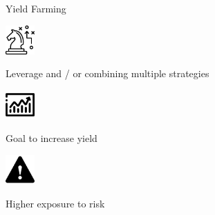 \documentclass[handout]{beamer}
\begin{document}
\begin{frame}{Yield Farming}


\begin{minipage}{0.2\textwidth}
			\begin{center}
				\includegraphics[height=3em]{../assets/images/strategy.png}
				
			\end{center}
		\end{minipage}
		\hspace{1 em}
		\begin{minipage}{0.72\textwidth}
			Leverage and / or combining multiple strategies

		\end{minipage}
		\pause
		\vspace{2 em}
		
		

		\begin{minipage}{0.2\textwidth}
			\begin{center}
				\includegraphics[height=3em]{../assets/images/exchange.png}
			\end{center}
		\end{minipage}
		\hspace{1 em}
		\begin{minipage}{0.72\textwidth}
			Goal to increase yield
		\end{minipage}
	
		\pause
		\vspace{2 em}
		\begin{minipage}{0.2\textwidth}
			\begin{center}
				\includegraphics[height=3em]{../assets/images/warning.png}
			\end{center}
		\end{minipage}
		\hspace{1 em}
		\begin{minipage}{0.72\textwidth}
		Higher exposure to risk 
		\end{minipage}
		
		
		
		
\end{frame}
\end{document}
